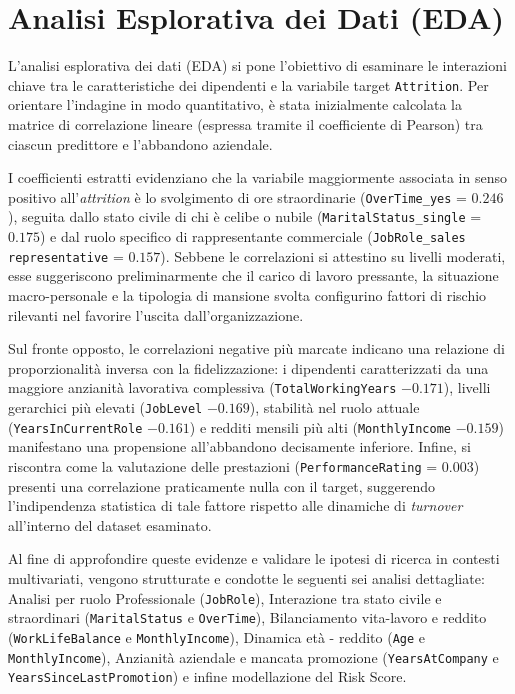\documentclass[11pt,a4paper]{article}
\begin{document}
\section{Analisi Esplorativa dei Dati (EDA)}
L'analisi esplorativa dei dati (EDA) si pone l'obiettivo di esaminare le interazioni chiave tra le caratteristiche dei dipendenti e la variabile target \texttt{Attrition}. Per orientare l'indagine in modo quantitativo, è stata inizialmente calcolata la matrice di correlazione lineare (espressa tramite il coefficiente di Pearson) tra ciascun predittore e l'abbandono aziendale. 

I coefficienti estratti evidenziano che la variabile maggiormente associata in senso positivo all'\textit{attrition} è lo svolgimento di ore straordinarie (\texttt{OverTime\_yes} = $0.246$), seguita dallo stato civile di chi è celibe o nubile (\texttt{MaritalStatus\_single} = $0.175$) e dal ruolo specifico di rappresentante commerciale (\texttt{JobRole\_sales representative} = $0.157$). Sebbene le correlazioni si attestino su livelli moderati, esse suggeriscono preliminarmente che il carico di lavoro pressante, la situazione macro-personale e la tipologia di mansione svolta configurino fattori di rischio rilevanti nel favorire l'uscita dall'organizzazione.

Sul fronte opposto, le correlazioni negative più marcate indicano una relazione di proporzionalità inversa con la fidelizzazione: i dipendenti caratterizzati da una maggiore anzianità lavorativa complessiva (\texttt{TotalWorkingYears}  $-0.171$), livelli gerarchici più elevati (\texttt{JobLevel}  $-0.169$), stabilità nel ruolo attuale (\texttt{YearsInCurrentRole}  $-0.161$) e redditi mensili più alti (\texttt{MonthlyIncome}  $-0.159$) manifestano una propensione all'abbandono decisamente inferiore. Infine, si riscontra come la valutazione delle prestazioni (\texttt{PerformanceRating} = $0.003$) presenti una correlazione praticamente nulla con il target, suggerendo l'indipendenza statistica di tale fattore rispetto alle dinamiche di \textit{turnover} all'interno del dataset esaminato.

Al fine di approfondire queste evidenze e validare le ipotesi di ricerca in contesti multivariati, vengono strutturate e condotte le seguenti sei analisi dettagliate: Analisi per ruolo Professionale (\texttt{JobRole}), Interazione tra stato civile e straordinari (\texttt{MaritalStatus} e \texttt{OverTime}), Bilanciamento vita-lavoro e reddito (\texttt{WorkLifeBalance} e \texttt{MonthlyIncome}), Dinamica età -  reddito (\texttt{Age} e \texttt{MonthlyIncome}), Anzianità aziendale e mancata promozione (\texttt{YearsAtCompany} e \texttt{YearsSinceLastPromotion}) e infine modellazione del Risk Score. 
\end{document}
